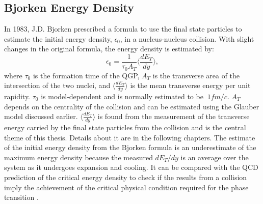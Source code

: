 \subsection{Bjorken Energy Density}
In 1983, J.D. Bjorken\cite{PhysRevD.27.140} prescribed a formula to use the final state particles to estimate the initial energy density, $\epsilon_{0}$, in a nucleus-nucleus collision. With slight changes in the original formula, the energy density is estimated by:
	\begin{equation}\label{eqn:bjorken}
	\epsilon_{0} = \frac{1}{\tau_{0}A_{T}}\langle\frac{dE_{T}}{dy}\rangle,
	\end{equation}
where $\tau_{0}$ is the formation time of the QGP, $A_{T}$ is the transverse area of the intersection of the two nuclei, and $\langle\frac{dE_{T}}{dy}\rangle$ is the mean transverse energy per unit rapidity. $\tau_{0}$ is model-dependent and is normally estimated to be $~1 fm/c$. $A_{T}$ depends on the centrality of the collision and can be estimated using the Glauber model discussed earlier. $\langle\frac{dE_{T}}{dy}\rangle$ is found from the measurement of the transverse energy carried by the final state particles from the collision and is the central theme of this thesis. Details about it are in the following chapters.
The estimate of the initial energy density from the Bjorken formula is an underestimate of the maximum energy density because the measured $dE_{T}/dy$ is an average over the system as it undergoes expansion and cooling. It can be compared with the QCD prediction of the critical energy density \cite{Adam:2139456} to check if the results from a collision imply the achievement of the critical physical condition required for the phase transition \cite{2005PrPNP..54..443J}.

